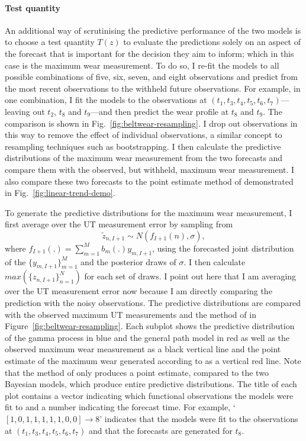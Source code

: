 \paragraph*{Test quantity}
An additional way of scrutinising the predictive performance of the two models is to choose a test quantity $T(z)$ \citep[p.~145]{BDA2020} to evaluate the predictions solely on an aspect of the forecast that is important for the decision they aim to inform; which in this case is the maximum wear measurement. To do so, I re-fit the models to all possible combinations of five, six, seven, and eight observations and predict from the most recent observations to the withheld future observations.  For example, in one combination, I fit the models to the observations at $(t_1, t_3, t_4, t_5, t_6, t_7)$---leaving out $t_2$, $t_8$ and $t_9$---and then predict the wear profile at $t_8$ and $t_9$. The comparison is shown in Fig.~\ref{fig:beltwear-resampling}. I drop out observations in this way to remove the effect of individual observations, a similar concept to resampling techniques such as bootstrapping. I then calculate the predictive distributions of the maximum wear measurement from the two forecasts and compare them with the observed, but withheld, maximum wear measurement. I also compare these two forecasts to the point estimate method of \citet{webb_2020} demonstrated in Fig.~\ref{fig:linear-trend-demo}.

To generate the predictive distributions for the maximum wear measurement, I first average over the UT measurement error by sampling from
\begin{equation}
  \tilde{z}_{n, I + 1} \sim N \left(f_{I+1}(n), \sigma \right),
\end{equation}
where $f_{I+1}(.) = \sum^{M}_{m = 1}b_m(.)y_{m, I + 1}$, using the forecasted joint distribution of the $\{y_{m, I + 1}\}^M_{m = 1}$ and the posterior draws of $\sigma$. I then calculate $max(\{z_{n, I + 1}\}^N_{n = 1})$ for each set of draws. I point out here that I am averaging over the UT measurement error now because I am directly comparing the prediction with the noisy observations. The predictive distributions are compared with the observed maximum UT measurements and the method of \citet{webb_2020} in Figure~\ref{fig:beltwear-resampling}. Each subplot shows the predictive distribution of the gamma process in blue and the general path model in red as well as the observed maximum wear measurement as a black vertical line and the point estimate of the maximum wear generated according to \citet{webb_2020} as a vertical red line. Note that the method of \citet{webb_2020} only produces a point estimate, compared to the two Bayesian models, which produce entire predictive distributions. The title of each plot contains a vector indicating which functional observations the models were fit to and a number indicating the forecast time. For example, `$[1, 0, 1, 1, 1, 1, 1, 0, 0] \rightarrow 8$' indicates that the models were fit to the observations at $(t_1, t_3, t_4, t_5, t_6, t_7)$ and that the forecasts are generated for $t_8$.

